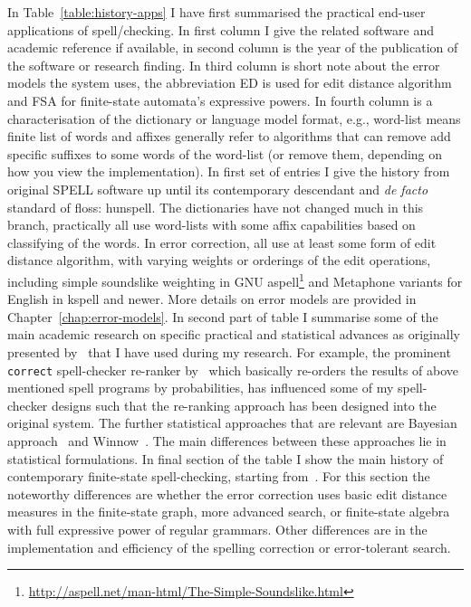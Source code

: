 \documentclass[officiallayout]{unihelcompling}
\begin{document}
In Table~\ref{table:history-apps} I have first summarised the practical
end-user applications of spell\-/checking. In first column I give the
related software and academic reference if available, in second column is the
year of the publication of the software or research finding. In third column
is short note about the error models the system uses, the abbreviation ED is
used for edit distance algorithm and FSA for finite-state automata's 
expressive powers. In fourth column is a characterisation of the dictionary
or language model format, e.g., word-list means finite list of words and 
affixes generally refer to algorithms that can remove add specific suffixes to
some words of the word-list (or remove them, depending on how you view the
implementation).
In first set of entries I give the history from original SPELL software up
until its contemporary descendant and \emph{de facto} standard of
\gls{floss}: hunspell. The dictionaries have
not changed much in this branch, practically all use word-lists with some
affix capabilities based on classifying of the words. In error correction,
all use at least some form of edit distance algorithm, with varying weights
or orderings of the edit operations, including simple soundslike weighting
in GNU aspell\footnote{\url{http://aspell.net/man-html/The-Simple-Soundslike.html}} and Metaphone variants for English in kspell and newer. More details on
error models are provided in  Chapter~\ref{chap:error-models}.
In second part of table I summarise some of the main academic research
on specific practical and statistical advances as originally presented
by~\citet{al2006learning} that I have used during my research. For example, the
prominent \texttt{correct} spell-checker re-ranker by~\citet{church1991probability} which basically re-orders the results of above mentioned spell programs by
probabilities, has influenced some of my spell-checker designs such that
the re-ranking approach has been designed into the original system.
The further statistical approaches that are relevant are Bayesian 
approach~\citep{golding1995bayesian} and Winnow~\citep{golding1999winnow}. The
main differences between these approaches lie in statistical formulations.
In final section of the table I show the main history of contemporary 
finite-state spell-checking, starting from~\citet{oflazer1996errortolerant}.
For this section the noteworthy differences are whether the error correction
uses basic edit distance measures in the finite-state graph, more advanced
search, or finite-state algebra with full expressive power of regular grammars.
Other differences are in the implementation and efficiency of the
spelling correction or error-tolerant search.
\end{document}
